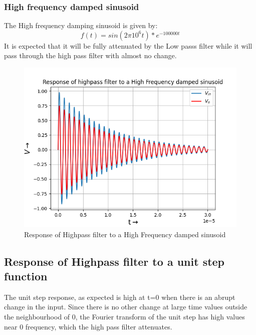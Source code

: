 \documentclass{article}
\begin{document}
\subsubsection{High frequency damped sinusoid}
The High frequency damping sinusoid is given by:
\begin{equation}
    f(t) = sin(2\pi10^6t)*e^{-100000t}
\end{equation}
It is expected that it will be fully attenuated by the Low passs filter while it will pass through the high pass filter with almost no change.
\begin{figure}[h!]
\centering
\includegraphics[scale=0.6]{Figure_8.png}
\caption{Response of Highpass filter to a High Frequency damped sinusoid}
\label{fig:System Response with Decay = 0.05}
\end{figure}

\clearpage

\subsection{Response of Highpass filter to a unit step function}
The unit step response, as expected is high at t=0 when there is an abrupt change in the input. Since there is no other change at large time values outside the neighbourhood of 0, the Fourier transform of the unit step has high values near 0 frequency, which the high pass filter attenuates.
\end{document}
